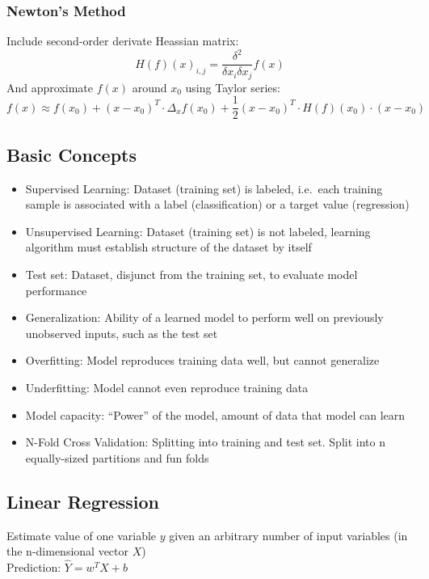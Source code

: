 \subsubsection{Newton's Method}%
\label{ml:ssub:netwons_method}
Include second-order derivate Heassian matrix:
\[H(f)(x)_{i,j} = \frac{\delta^2}{\delta x_i \delta x_j} f(x)\]
And approximate \(f(x)\) around \(x_0\) using Taylor series:
\[f(x) \approx f(x_0) + {(x - x_0)}^T \cdot \Delta_x f(x_0) + \frac{1}{2} {(x - x_0)}^T \cdot H (f)(x_0) \cdot (x - x_0)\]

\subsection{Basic Concepts}%
\label{ml:sub:basic_concepts}
\begin{itemize}
\item Supervised Learning: Dataset (training set) is labeled, i.e.\ each training sample is associated with a
  label (classification) or a target value (regression)
\item Unsupervised Learning: Dataset (training set) is not labeled, learning algorithm must establish structure
  of the dataset by itself
\item Test set: Dataset, disjunct from the training set, to evaluate model performance
\item Generalization: Ability of a learned model to perform well on previously unobserved inputs, such as the test set
\item Overfitting: Model reproduces training data well, but cannot generalize
\item Underfitting: Model cannot even reproduce training data
\item Model capacity: \enquote{Power} of the model, amount of data that model can learn
\item N-Fold Cross Validation: Splitting into training and test set. Split into n equally-sized partitions and fun folds
\end{itemize}

\subsection{Linear Regression}%
\label{ml:sub:linear_regression}
Estimate value of one variable \(y\) given an arbitrary number of input variables (in the n-dimensional vector \(X\))\\

Prediction: \(\hat{Y} = w^T X + b\)\\

